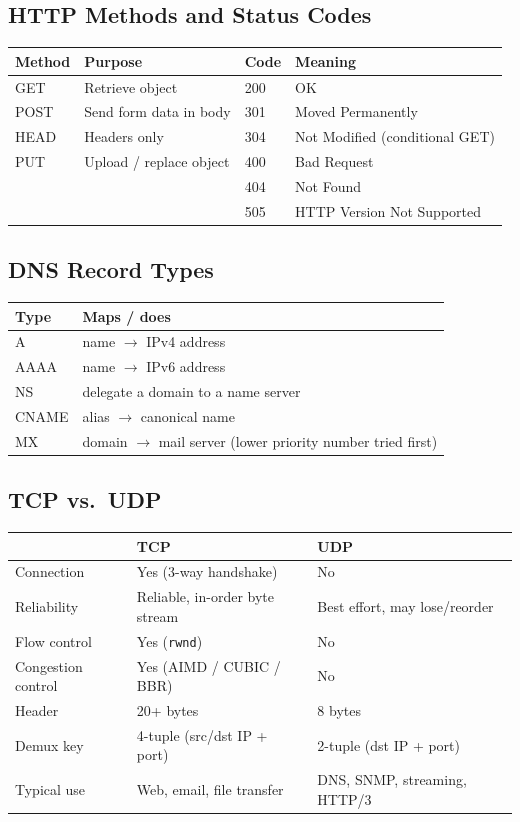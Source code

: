 \documentclass[hidelinks]{article}
\begin{document}
\subsection{HTTP Methods and Status Codes}

\noindent\begin{tabularx}{\textwidth}{|l|X||l|X|}
\hline
\textbf{Method} & \textbf{Purpose} & \textbf{Code} & \textbf{Meaning} \\
\hline
GET  & Retrieve object & 200 & OK \\
\hline
POST & Send form data in body & 301 & Moved Permanently \\
\hline
HEAD & Headers only & 304 & Not Modified (conditional GET) \\
\hline
PUT  & Upload / replace object & 400 & Bad Request \\
\hline
     &  & 404 & Not Found \\
\hline
     &  & 505 & HTTP Version Not Supported \\
\hline
\end{tabularx}

\subsection{DNS Record Types}

\noindent\begin{tabularx}{\textwidth}{|l|X|}
\hline
\textbf{Type} & \textbf{Maps / does} \\
\hline
A     & name $\to$ IPv4 address \\
\hline
AAAA  & name $\to$ IPv6 address \\
\hline
NS    & delegate a domain to a name server \\
\hline
CNAME & alias $\to$ canonical name \\
\hline
MX    & domain $\to$ mail server (lower priority number tried first) \\
\hline
\end{tabularx}

\subsection{TCP vs.\ UDP}

\noindent\begin{tabularx}{\textwidth}{|l|X|X|}
\hline
 & \textbf{TCP} & \textbf{UDP} \\
\hline
Connection & Yes (3-way handshake) & No \\
\hline
Reliability & Reliable, in-order byte stream & Best effort, may lose/reorder \\
\hline
Flow control & Yes (\texttt{rwnd}) & No \\
\hline
Congestion control & Yes (AIMD / CUBIC / BBR) & No \\
\hline
Header & 20+ bytes & 8 bytes \\
\hline
Demux key & 4-tuple (src/dst IP + port) & 2-tuple (dst IP + port) \\
\hline
Typical use & Web, email, file transfer & DNS, SNMP, streaming, HTTP/3 \\
\hline
\end{tabularx}
\end{document}
